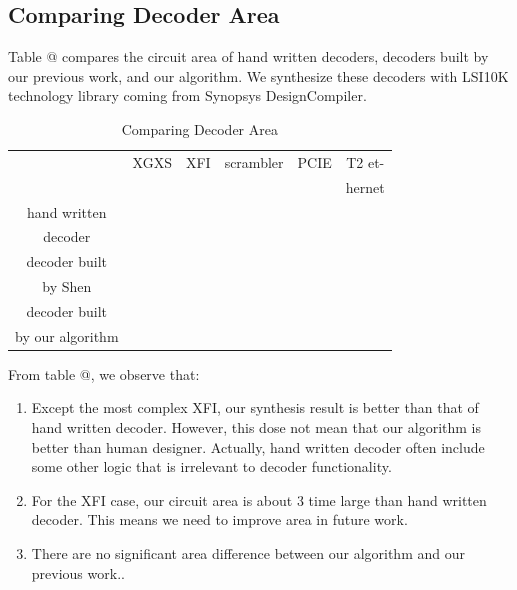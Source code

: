 \documentclass[journal]{IEEEtran}
\makeatletter
\newcommand{\Rmnum}[1]{\expandafter\@slowromancap\romannumeral #1@}
\makeatother
\begin{document}
\subsection{Comparing Decoder Area}

Table \Rmnum{4} compares the circuit area of hand written decoders,
decoders built by our previous work\cite{ShegnYuShen:iccad09},
and our algorithm.
We synthesize these decoders with LSI10K technology library coming from Synopsys DesignCompiler.

\begin{table}[!t]
\centering
\caption{Comparing Decoder Area}
\begin{tabular}{|c|c|c|c|c|c|}
\hline
&XGXS&XFI&scrambler&PCIE&T2 et-\\
&&&&&hernet\\ \hline
hand written      &       &     &         &   &          \\
decoder          &&&&&\\ \hline
decoder built     &       &     &         &   &          \\
by Shen\cite{ShegnYuShen:iccad09}   &&&&&\\ \hline
decoder built     &       &     &         &   &          \\
by our algorithm   &&&&&\\ \hline
\end{tabular}
\end{table}

From table \Rmnum{4},
we observe that:
\begin{enumerate}
\item Except the most complex XFI,
our synthesis result is better than that of hand written decoder.
However,
this dose not mean that our algorithm is better than human designer.
Actually,
hand written decoder often include some other logic that is irrelevant to decoder functionality.
\item For the XFI case,
our circuit area is about 3 time large than hand written decoder.
This means we need to improve area in future work.
\item There are no significant area difference between our algorithm and our previous work.\cite{ShegnYuShen:iccad09}.
\end{enumerate}
\end{document}
